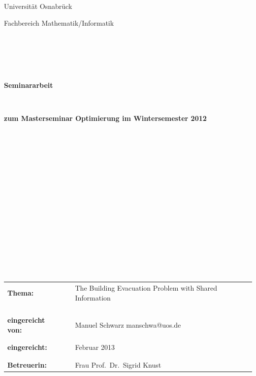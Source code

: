 \documentclass[a4paper, 11pt]{scrreprt}
\begin{document}
\thispagestyle{empty}
\begin{center}
\Large{Universität Osnabrück}\\
\end{center}


\begin{center}
\Large{Fachbereich Mathematik/Informatik}
\end{center}
\begin{verbatim}





\end{verbatim}
\begin{center}
\textbf{\LARGE{Seminararbeit}}
\end{center}
\begin{verbatim}


\end{verbatim}
\begin{center}
\textbf{zum Masterseminar Optimierung im Wintersemester 2012}
\end{center}
\begin{verbatim}
















\end{verbatim}

\begin{flushleft}
\begin{tabular}{lll}
\textbf{Thema:} & & The Building Evacuation Problem with Shared Information\\
& & \\
& & \\
& & \\
& & \\
\textbf{eingereicht von:} & & Manuel Schwarz \flq{}manschwa@uos.de\frq{}\\
& & \\
& & \\
\textbf{eingereicht:} & & Februar 2013\\
& & \\
& & \\
\textbf{Betreuerin:} & & Frau Prof.\ Dr.\ Sigrid Knust
\end{tabular}
\end{flushleft}

\newpage
\end{document}
